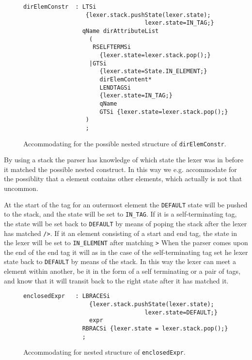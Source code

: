 \begin{figure}[h!]
\begin{Verbatim}
dirElemConstr  : LTSi 
                  {lexer.stack.pushState(lexer.state); 
                                   lexer.state=IN_TAG;}
                 qName dirAttributeList
                   (
                    RSELFTERMSi
                      {lexer.state=lexer.stack.pop();}
                   |GTSi 
                      {lexer.state=State.IN_ELEMENT;}
                      dirElemContent* 
                      LENDTAGSi 
                      {lexer.state=IN_TAG;}
                      qName 
                      GTSi {lexer.state=lexer.stack.pop();}
                  )
                  ;
\end{Verbatim}
\caption[Accommodating for a nested structure of \texttt{dirElemConstr}]{Accommodating for the possible nested structure of \texttt{dirElemConstr}.}
\label{fig:nestedTransitionElement}
\end{figure}

By using a stack the parser has knowledge of which state the lexer was in before it matched the possible nested construct. In this way we e.g. accommodate for the possiblity that a element contains other elements, which actually is not that uncommon. 

At the start of the tag for an outermost element the \verb!DEFAULT! state will be pushed to the stack, and the state will be set to \verb!IN_TAG!. If it is a self-terminating tag, the state will be set back to \verb!DEFAULT! by means of poping the stack after the lexer has matched \verb!/>!. If it an element consisting of a start and end tag, the state in the lexer will be set to \verb!IN_ELEMENT! after matching \verb!>! When the parser comes upon the end of the end tag it will as in the case of the self-terminating tag set he lexer state back to \verb!DEFAULT! by means of the stack. In this way the lexer can meet a element within another, be it in the form of a self terminating or a pair of tags, and know that it will transit back to the right state after it has matched it.

\begin{figure}[h!]
\begin{Verbatim}
enclosedExpr   : LBRACESi 
                   {lexer.stack.pushState(lexer.state); 
                                   lexer.state=DEFAULT;}
                   expr 
                 RBRACSi {lexer.state = lexer.stack.pop();}
                 ;
\end{Verbatim}
\caption[Accommodating for nested structure of \texttt{enclosedExpr}]{Accommodating for nested structure of \texttt{enclosedExpr}.}
\label{fig:nestedTransitionExpr}
\end{figure}

